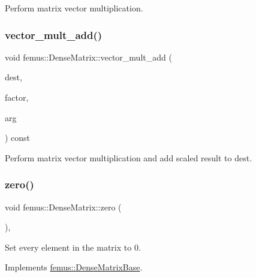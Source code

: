 Perform matrix vector multiplication. 

\mbox{\label{classfemus_1_1_dense_matrix_a295b7577e8910a0600dacadd1c30b15b}} 
\subsubsection{\texorpdfstring{vector\+\_\+mult\+\_\+add()}{vector\_mult\_add()}}
{\footnotesize\ttfamily void femus\+::\+Dense\+Matrix\+::vector\+\_\+mult\+\_\+add (\begin{DoxyParamCaption}\item[{\mbox{\hyperlink{classfemus_1_1_dense_vector}{Dense\+Vector}} \&}]{dest,  }\item[{const double}]{factor,  }\item[{const \mbox{\hyperlink{classfemus_1_1_dense_vector}{Dense\+Vector}} \&}]{arg }\end{DoxyParamCaption}) const}



Perform matrix vector multiplication and add scaled result to {\ttfamily dest}. 

\mbox{\label{classfemus_1_1_dense_matrix_a865963674763716d720d6ef2c8177053}} 
\subsubsection{\texorpdfstring{zero()}{zero()}}
{\footnotesize\ttfamily void femus\+::\+Dense\+Matrix\+::zero (\begin{DoxyParamCaption}{ }\end{DoxyParamCaption})\hspace{0.3cm}{\ttfamily [inline]}, {\ttfamily [virtual]}}



Set every element in the matrix to 0. 



Implements \mbox{\hyperlink{classfemus_1_1_dense_matrix_base_a25fc3a015ffb804afc61b8a33c9565d1}{femus\+::\+Dense\+Matrix\+Base}}.



